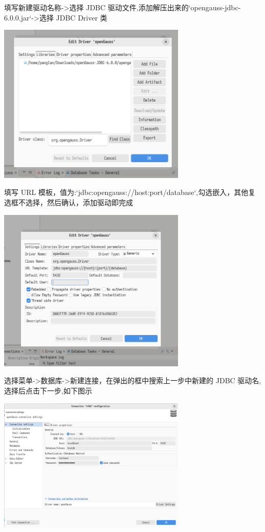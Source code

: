 \documentclass{article}
\begin{document}
填写新建驱动名称->选择 JDBC 驱动文件,添加解压出来的`opengauss-jdbc-6.0.0.jar`->选择 JDBC Driver 类

\begin{center}
\includegraphics[width=9cm]{./image/3.png}
\end{center}

填写 URL 模板，值为:`jdbc:opengauss://{host}:{port}/{database}`,勾选嵌入，其他复选框不选择，然后确认，添加驱动即完成

\begin{center}
\includegraphics[width=9cm]{./image/2.png}
\end{center}

选择菜单->数据库->新建连接，在弹出的框中搜索上一步中新建的 JDBC 驱动名,选择后点击下一步,如下图示

\begin{center}
\includegraphics[width=9cm]{./image/4.png}
\end{center}
\end{document}
